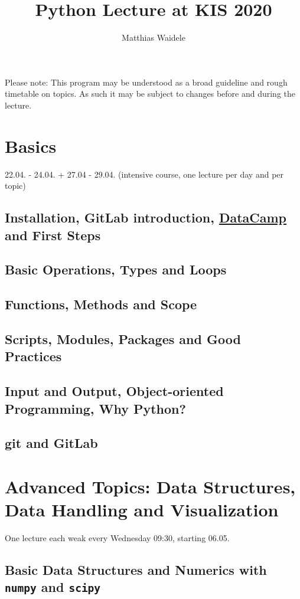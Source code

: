 \documentclass[10pt,a4paper]{article}
\begin{document}
	\title{Python Lecture at KIS 2020}
	\author{Matthias Waidele}
	\date{}
	
	\maketitle
	Please note: This program may be understood as a broad guideline and rough timetable on topics. As such it may be subject to changes before and during the lecture.
	
	\section{Basics}
	22.04. - 24.04. + 27.04 - 29.04. (intensive course, one lecture per day and per topic)
	
		\subsection{Installation, GitLab introduction, \href{https://learn.datacamp.com/}{DataCamp} and First Steps}
		\subsection{Basic Operations, Types and Loops}
		\subsection{Functions, Methods and Scope}
		\subsection{Scripts, Modules, Packages and Good Practices}
		\subsection{Input and Output, Object-oriented Programming, Why Python?}
		\subsection{git and GitLab}
	
	\vspace{1cm}
	\section{Advanced Topics: Data Structures, Data Handling and Visualization}
	One lecture each weak every Wednesday 09:30, starting 06.05.
		
		\subsection{Basic Data Structures and Numerics with \texttt{numpy} and \texttt{scipy}}
\end{document}
